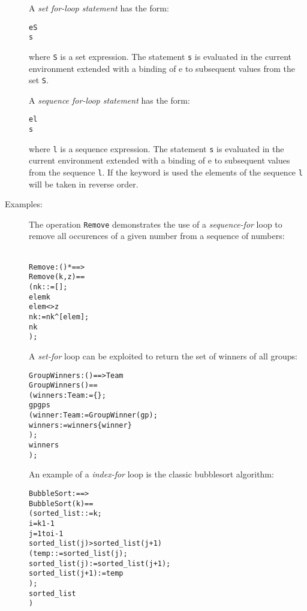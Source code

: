 \documentclass[\pformat,12pt]{article}
\begin{document}
\begin{description}
  A {\it set for-loop statement\/} has the form:
  \begin{alltt}
     e  S 
    s
  \end{alltt}
  where {\tt S} is a set expression. The statement {\tt s} is evaluated in
  the current environment extended with a binding of e to subsequent values
  from the set {\tt S}.

  A {\it sequence for-loop statement\/} has the form:
  \begin{alltt}
     e  l 
    s
  \end{alltt}
  where {\tt l} is a sequence expression. The statement {\tt s} is
  evaluated in the current environment extended with a binding of e to
  subsequent values from the sequence {\tt l}. If the keyword
   is used the elements of the sequence {\tt l} will be
  taken in reverse order.

\item[Examples:] The operation \texttt{Remove} demonstrates the use of a 
  \textit{sequence-for} loop to remove all occurences of a given number from a 
  sequence of numbers:
  \begin{alltt}\label{removeDef}
  Remove : () *  ==> 
  Remove (k,z) ==
  ( nk :  := [];
    elem  k 
      elem <> z
      nk := nk^[elem];
    nk
  );
  \end{alltt}
  A \textit{set-for} loop can be exploited to return the set of winners of 
  all groups:
  \begin{alltt}
  GroupWinners: () ==>  Team
  GroupWinners () ==
  ( winners :  Team := \{\};
    gp  gps 
     ( winner: Team := GroupWinner(gp);
      winners := winners  \{winner\}
     );
    winners
   );
  \end{alltt}
  An example of a \textit{index-for} loop is the classic bubblesort 
  algorithm:
  \begin{alltt}
  BubbleSort :  ==> 
  BubbleSort (k) ==
    ( sorted_list :  := k;
      i =  k  1  -1 
        j = 1 to i-1 
          sorted_list(j) > sorted_list(j+1)
          ( temp: := sorted_list(j);
               sorted_list(j) := sorted_list(j+1);
               sorted_list(j+1) := temp
              );
      sorted_list
     )
\end{alltt}
\end{description}
\end{document}
